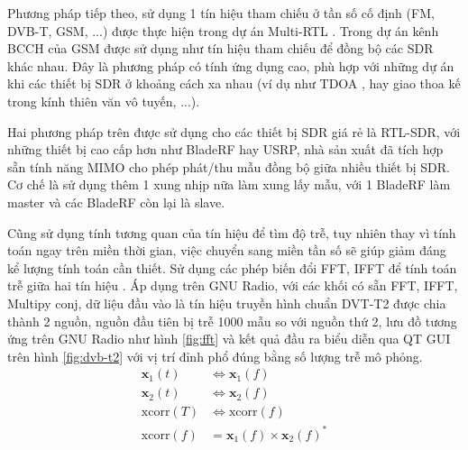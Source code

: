 {%

\textendash\hspace{0.1cm} Phương pháp tiếp theo, sử dụng 1 tín hiệu tham chiếu ở tần số cố định (FM, DVB-T, GSM, ...) được thực hiện trong dự án Multi-RTL \cite{multi-rtl}. Trong dự án kênh BCCH của GSM được sử dụng như tín hiệu tham chiếu để đồng bộ các SDR khác nhau. Đây là phương pháp có tính ứng dụng cao, phù hợp với những dự án khi các thiết bị SDR ở khoảng cách xa nhau (ví dụ như TDOA \cite{SDR}, hay giao thoa kế trong kính thiên văn vô tuyến, ...).

\textendash\hspace{0.1cm} Hai phương pháp trên được sử dụng cho các thiết bị SDR giá rẻ là RTL-SDR, với những thiết bị cao cấp hơn như BladeRF hay USRP, nhà sản xuất đã tích hợp sẵn tính năng MIMO cho phép phát/thu mẫu đồng bộ giữa nhiều thiết bị SDR. Cơ chế là sử dụng thêm 1 xung nhịp nữa làm xung lấy mẫu, với 1 BladeRF làm master và các BladeRF còn lại là slave.

\textendash\hspace{0.1cm}Cũng sử dụng tính tương quan của tín hiệu để tìm độ trễ, tuy nhiên thay vì tính toán ngay trên miền thời gian, việc chuyển sang miền tần số sẽ giúp giảm đáng kể lượng tính toán cần thiết. Sử dụng các phép biến đổi  FFT, IFFT để tính toán trễ giữa hai tín hiệu \cite{Nentwig2016}. Áp dụng trên GNU Radio, với các khối có sẵn FFT, IFFT, Multipy conj, dữ liệu đầu vào là tín hiệu truyền hình chuẩn DVT-T2 được chia thành 2 nguồn, nguồn đầu tiên bị trễ 1000 mẫu so với nguồn thứ 2, lưu đồ tương ứng trên GNU Radio như hình \ref{fig:fft} và kết quả đầu ra biểu diễn qua QT GUI trên hình \ref{fig:dvb-t2} với vị trí đỉnh phổ đúng bằng số lượng trễ mô phỏng.
\begin{equation}
\begin{split}
\mathbf{x}_1(t) &\Leftrightarrow \mathbf{x}_1(f)\\
\mathbf{x}_2(t) &\Leftrightarrow \mathbf{x}_2(f)\\
\textrm{xcorr}(T) &\Leftrightarrow \textrm{xcorr}(f)\\
\textrm{xcorr}(f) &= \mathbf{x}_1(f) \times \mathbf{x}_2(f)^{*}
\end{split}
\end{equation}


}
